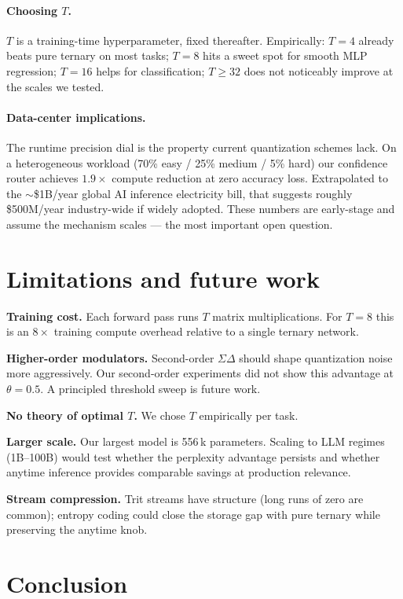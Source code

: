 \documentclass[11pt]{article}
\begin{document}
\paragraph{Choosing $T$.} $T$ is a training-time hyperparameter, fixed
thereafter. Empirically: $T=4$ already beats pure ternary on most
tasks; $T=8$ hits a sweet spot for smooth MLP regression; $T=16$
helps for classification; $T \ge 32$ does not noticeably improve at
the scales we tested.

\paragraph{Data-center implications.} The runtime precision dial is
the property current quantization schemes lack. On a heterogeneous
workload (70\% easy / 25\% medium / 5\% hard) our confidence router
achieves $1.9\times$ compute reduction at zero accuracy loss.
Extrapolated to the $\sim$\$1B/year global AI inference electricity
bill, that suggests roughly \$500M/year industry-wide if widely
adopted. These numbers are early-stage and assume the mechanism
scales --- the most important open question.

\section{Limitations and future work}

\textbf{Training cost.} Each forward pass runs $T$ matrix
multiplications. For $T=8$ this is an $8\times$ training compute
overhead relative to a single ternary network.

\textbf{Higher-order modulators.} Second-order $\Sigma\Delta$ should
shape quantization noise more aggressively. Our second-order
experiments did not show this advantage at $\theta = 0.5$. A
principled threshold sweep is future work.

\textbf{No theory of optimal $T$.} We chose $T$ empirically per task.

\textbf{Larger scale.} Our largest model is 556\,k parameters.
Scaling to LLM regimes (1B--100B) would test whether the perplexity
advantage persists and whether anytime inference provides comparable
savings at production relevance.

\textbf{Stream compression.} Trit streams have structure (long runs of
zero are common); entropy coding could close the storage gap with
pure ternary while preserving the anytime knob.

\section{Conclusion}
\end{document}
